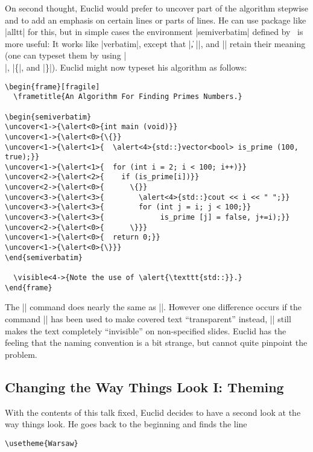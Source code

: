 On second thought, Euclid would prefer to uncover part of the algorithm stepwise and to add an emphasis on certain lines or parts of lines. He can use package like |alltt| for this, but in simple cases the environment |{semiverbatim}| defined by \beamer\ is more useful: It works like |{verbatim}|, except that |\|, |{|, and |}| retain their meaning (one can typeset them by using |\\|, |\{|, and |\}|). Euclid might now typeset his algorithm as follows:
\begin{verbatim}
\begin{frame}[fragile]
  \frametitle{An Algorithm For Finding Primes Numbers.}

\begin{semiverbatim}
\uncover<1->{\alert<0>{int main (void)}}
\uncover<1->{\alert<0>{\{}}
\uncover<1->{\alert<1>{  \alert<4>{std::}vector<bool> is_prime (100, true);}}
\uncover<1->{\alert<1>{  for (int i = 2; i < 100; i++)}}
\uncover<2->{\alert<2>{    if (is_prime[i])}}
\uncover<2->{\alert<0>{      \{}}
\uncover<3->{\alert<3>{        \alert<4>{std::}cout << i << " ";}}
\uncover<3->{\alert<3>{        for (int j = i; j < 100;}}
\uncover<3->{\alert<3>{             is_prime [j] = false, j+=i);}}
\uncover<2->{\alert<0>{      \}}}
\uncover<1->{\alert<0>{  return 0;}}
\uncover<1->{\alert<0>{\}}}
\end{semiverbatim}

  \visible<4->{Note the use of \alert{\texttt{std::}}.}
\end{frame}
\end{verbatim}
The |\visible| command does nearly the same as |\uncover|. However one difference occurs if the command || has been used to make covered text ``transparent'' instead, |\visible| still makes the text completely ``invisible'' on non-specified slides. Euclid has the feeling that the naming convention is a bit strange, but cannot quite pinpoint the problem.


\subsection{Changing the Way Things Look I: Theming}

With the contents of this talk fixed, Euclid decides to have a second look at the way things look. He goes back to the beginning and finds the line
\begin{verbatim}
\usetheme{Warsaw}
\end{verbatim}

